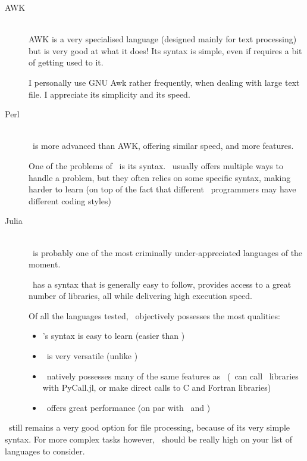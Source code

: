  
\begin{description}
	\item[AWK] \mbox{}  \\
	AWK is a very specialised language (designed mainly for text processing) but is very good at what it does! Its syntax is simple, even if requires a bit of getting used to it. 
	
	I personally use GNU Awk rather frequently, when dealing with large text file. I appreciate its simplicity and its speed.
	
	\item[Perl] \mbox{} \\
	\perl\ is more advanced than AWK, offering similar speed, and more features. 
	
	One of the problems of \perl\ is its syntax. \perl\ usually offers multiple ways to handle a problem, but they often relies on some specific syntax, making harder to learn (on top of the fact that different \perl\ programmers may have different coding styles)
		
	\item[Julia] \mbox{} \\
	\julia\ is probably one of the most criminally under-appreciated languages of the moment.
	
	\julia\ has a syntax that is generally easy to follow, provides access to a great number of libraries, all while delivering high execution speed.

	Of all the languages tested, \julia\ objectively possesses the most qualities:
	
	\begin{itemize}
		\item \julia's syntax is easy to learn (easier than \perl)
		\item \julia\ is very versatile (unlike \awk)
		\item \julia\ natively possesses many of the same features as \python\ (\julia\ can call \python\ libraries with PyCall.jl, or make direct calls to C and Fortran libraries)
		\item \julia\ offers great performance (on par with \awk\ and \perl)
	\end{itemize}
\end{description}

\bigskip


\awk\ still remains a very good option for file processing, because of its very simple syntax. For more complex tasks however, \julia\ should be really high on your list of languages to consider. \\

